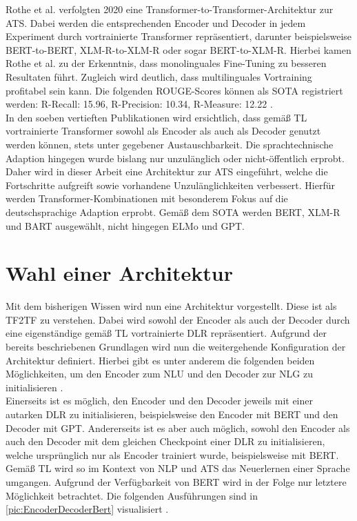 \noindent
Rothe et al. verfolgten 2020 eine Transformer-to-Transformer-Architektur zur \ac{ATS}. Dabei werden die entsprechenden Encoder und Decoder in jedem Experiment durch vortrainierte Transformer repräsentiert, darunter beispielsweise \ac{BERT}-to-\ac{BERT}, \ac{XLM-R}-to-\ac{XLM-R} oder sogar \ac{BERT}-to-\ac{XLM-R}. Hierbei kamen Rothe et al. zu der Erkenntnis, dass monolinguales Fine-Tuning zu besseren Resultaten führt. Zugleich wird deutlich, dass multilinguales Vortraining profitabel sein kann. Die folgenden \ac{ROUGE}-Scores können als \ac{SOTA} registriert werden: R-Recall: 15.96, R-Precision: 10.34, R-Measure: 12.22 \cite{ROT20}.\\

\noindent
In den soeben vertieften Publikationen wird ersichtlich, dass gemäß \ac{TL} vortrainierte Transformer sowohl als Encoder als auch als Decoder genutzt werden können, stets unter gegebener Austauschbarkeit. Die sprachtechnische Adaption hingegen wurde bislang nur unzulänglich oder nicht-öffentlich erprobt. Daher wird in dieser Arbeit eine Architektur zur \ac{ATS} eingeführt, welche die Fortschritte aufgreift sowie vorhandene Unzulänglichkeiten verbessert. Hierfür werden Transformer-Kombinationen mit besonderem Fokus auf die deutschsprachige Adaption erprobt. Gemäß dem \ac{SOTA} werden \ac{BERT}, \ac{XLM-R} und \ac{BART} ausgewählt, nicht hingegen \ac{ELMo} und \ac{GPT}.


\section{Wahl einer Architektur}
\noindent
Mit dem bisherigen Wissen wird nun eine Architektur vorgestellt. Diese ist als \ac{TF2TF} zu verstehen. Dabei wird sowohl der Encoder als auch der Decoder durch eine eigenständige gemäß \ac{TL} vortrainierte \ac{DLR} repräsentiert. Aufgrund der bereits beschriebenen Grundlagen wird nun die weitergehende Konfiguration der Architektur definiert. Hierbei gibt es unter anderem die folgenden beiden Möglichkeiten, um den Encoder zum \ac{NLU} und den Decoder zur \ac{NLG} zu initialisieren \cite[S.~2]{ROT20}.\\

\noindent
Einerseits ist es möglich, den Encoder und den Decoder jeweils mit einer autarken \ac{DLR} zu initialisieren, beispielsweise den Encoder mit \ac{BERT} und den Decoder mit \ac{GPT}. Andererseits ist es aber auch möglich, sowohl den Encoder als auch den Decoder mit dem gleichen Checkpoint einer \ac{DLR} zu initialisieren, welche ursprünglich nur als Encoder trainiert wurde, beispielsweise mit \ac{BERT}. Gemäß \ac{TL} wird so im Kontext von \ac{NLP} und \ac{ATS} das Neuerlernen einer Sprache umgangen. Aufgrund der Verfügbarkeit von \ac{BERT} wird in der Folge nur letztere Möglichkeit betrachtet. Die folgenden Ausführungen sind in \autoref{pic:EncoderDecoderBert} visualisiert \cite[S.~2-3]{ROT20}.\\

